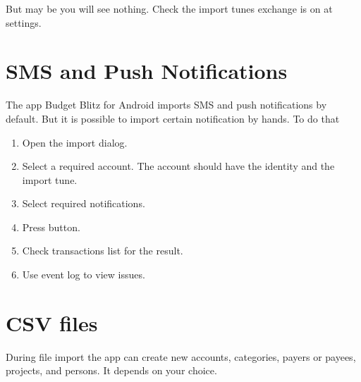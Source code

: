 \documentclass[a4paper,10pt,english]{sphinxmanual}
\begin{document}
\sphinxAtStartPar
But may be you will see nothing. Check the import tunes exchange is on at settings.


\section{SMS and Push Notifications}
\label{\detokenize{import:sms-and-push-notifications}}
\sphinxAtStartPar
The app Budget Blitz for Android imports SMS and push notifications by default. But it is possible to import
certain notification by hands. To do that
\begin{enumerate}
%
\item {} 
\sphinxAtStartPar
Open the import dialog.

\item {} 
\sphinxAtStartPar
Select a required account. The account should have the identity and the import tune.

\item {} 
\sphinxAtStartPar
Select required notifications.

\item {} 
\sphinxAtStartPar
Press  button.

\item {} 
\sphinxAtStartPar
Check transactions list for the result.

\item {} 
\sphinxAtStartPar
Use event log to view issues.

\end{enumerate}

\noindent{}
\noindent{}
\noindent{}
\noindent{}
\noindent{}
\noindent{}
\noindent{}
\noindent{}


\section{CSV files}
\label{\detokenize{import:csv-files}}
\sphinxAtStartPar
During  file import the app can create new accounts, categories, payers or payees,
projects, and persons. It depends on your choice.
\end{document}
